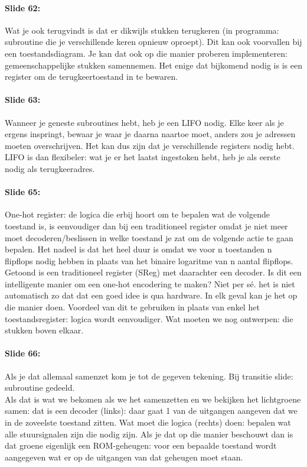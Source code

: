 \documentclass[10pt,a4paper]{book}
\begin{document}
\paragraph{Slide 62:} Wat je ook terugvindt is dat er dikwijls stukken terugkeren (in programma: subroutine die je verschillende keren opnieuw oproept). Dit kan ook voorvallen bij een toestandsdiagram. Je kan dat ook op die manier proberen implementeren: gemeenschappelijke stukken samennemen. Het enige dat bijkomend nodig is is een register om de terugkeertoestand in te bewaren. 

\paragraph{Slide 63:} Wanneer je geneste subroutines hebt, heb je een LIFO nodig. Elke keer als je ergens inspringt, bewaar je waar je daarna naartoe moet, anders zou je adressen moeten overschrijven. Het kan dus zijn dat je verschillende registers nodig hebt. LIFO is dan flexibeler: wat je er het laatst ingestoken hebt, heb je als eerste nodig als terugkeeradres. 

\paragraph{Slide 65:} One-hot register: de logica die erbij hoort om te bepalen wat de volgende toestand is, is eenvoudiger dan bij een traditioneel register omdat je niet meer moet decoderen/beslissen in welke toestand je zat om de volgende actie te gaan bepalen. Het nadeel is dat het heel duur is omdat we voor n toestanden n flipflops nodig hebben in plaats van het binaire logaritme van n aantal flipflops.\\
Getoond is een traditioneel register (SReg) met daarachter een decoder. Is dit een intelligente manier om een one-hot encodering te maken? Niet per s\'e. het is niet automatisch zo dat dat een goed idee is qua hardware. In elk geval kan je het op die manier doen. Voordeel van dit te gebruiken in plaats van enkel het toestandsregister: logica wordt eenvoudiger. Wat moeten we nog ontwerpen: die stukken boven elkaar. 

\paragraph{Slide 66:} Als je dat allemaal samenzet kom je tot de gegeven tekening. Bij transitie slide: subroutine gedeeld.\\
Als dat is wat we bekomen als we het samenzetten en we bekijken het lichtgroene samen: dat is een decoder (links): daar gaat 1 van de uitgangen aangeven dat we in de zoveelste toestand zitten. Wat moet die logica (rechts) doen: bepalen wat alle stuursignalen zijn die nodig zijn. Als je dat op die manier beschouwt dan is dat groene eigenlijk een ROM-geheugen: voor een bepaalde toestand wordt aangegeven wat er op de uitgangen van dat geheugen moet staan.
\end{document}
